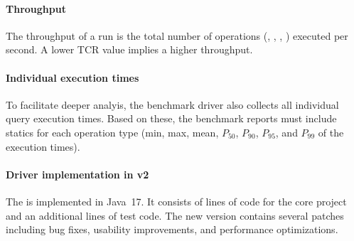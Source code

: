 \paragraph{Throughput}
%
The throughput of a run is the total number of operations
(\CR, \SR, \INS, \DEL)
executed per second.
A lower TCR value implies a higher throughput.

\paragraph{Individual execution times}
%
To facilitate deeper analyis, the benchmark driver also collects all individual query execution times.
Based on these, the benchmark reports must include statics for each operation type (min, max, mean, $P_{50}$, $P_{90}$, $P_{95}$, and $P_{99}$ of the execution times).

\paragraph{Driver implementation in v2}
The \interactivevtwo is implemented in Java~17.
It consists of  lines of code for the core project and an additional  lines of test code.
The new version contains several patches including bug fixes, usability improvements, and performance optimizations.


